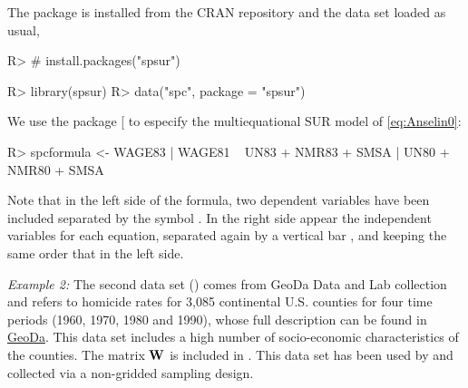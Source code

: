 \documentclass[article]{jss}
\begin{document}
The package is installed from the CRAN repository and the data set loaded as usual,

\begin{CodeChunk}

\begin{CodeInput}
R> # install.packages("spsur")
\end{CodeInput}
\end{CodeChunk}

\begin{CodeChunk}

\begin{CodeInput}
R> library(spsur)
R> data("spc", package = "spsur")
\end{CodeInput}
\end{CodeChunk}

We use the  package {[}\citet{Formula} to especify the multiequational SUR model of \eqref{eq:Anselin0}:

\begin{CodeChunk}

\begin{CodeInput}
R> spcformula <- WAGE83 | WAGE81 ~ UN83 + NMR83 + SMSA | UN80 + NMR80 + SMSA
\end{CodeInput}
\end{CodeChunk}

Note that in the left side of the formula, two dependent variables have been included separated by the symbol \textbar{}. In the right side appear the independent variables for each equation, separated again by a vertical bar \textbar{}, and keeping the same order that in the left side.

\emph{Example 2:} The second data set () comes from GeoDa Data and Lab collection and refers to homicide rates for 3,085 continental U.S. counties for four time periods (1960, 1970, 1980 and 1990), whose full description can be found in \href{https://geodacenter.github.io/data-and-lab/ncovr/}{GeoDa}. This data set includes a high number of socio-economic characteristics of the counties. The matrix \(\textbf W\) is included in . This data set has been used by \citet{Baller2001} and collected via a non-gridded sampling design.
\end{document}
